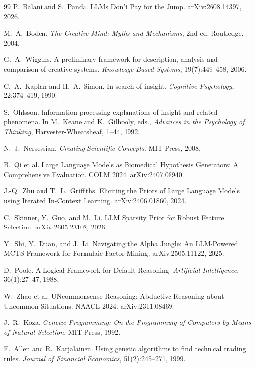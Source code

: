 \documentclass[11pt]{article}
\begin{document}
\begin{thebibliography}{99}
 P.~Balani and S.~Panda.
\newblock LLMs Don't Pay for the Jump.
\newblock arXiv:2608.14397, 2026.

 M.~A.~Boden.
\newblock \emph{The Creative Mind: Myths and Mechanisms}, 2nd ed. Routledge, 2004.

 G.~A.~Wiggins.
\newblock A preliminary framework for description, analysis and comparison of creative systems.
\newblock \emph{Knowledge-Based Systems}, 19(7):449--458, 2006.

 C.~A.~Kaplan and H.~A.~Simon.
\newblock In search of insight.
\newblock \emph{Cognitive Psychology}, 22:374--419, 1990.

 S.~Ohlsson.
\newblock Information-processing explanations of insight and related phenomena.
\newblock In M.~Keane and K.~Gilhooly, eds., \emph{Advances in the Psychology of Thinking},
Harvester-Wheatsheaf, 1--44, 1992.

 N.~J.~Nersessian.
\newblock \emph{Creating Scientific Concepts}. MIT Press, 2008.


 B.~Qi et al.
\newblock Large Language Models as Biomedical Hypothesis Generators: A Comprehensive Evaluation.
\newblock COLM 2024. arXiv:2407.08940.

 J.-Q.~Zhu and T.~L.~Griffiths.
\newblock Eliciting the Priors of Large Language Models using Iterated In-Context Learning.
\newblock arXiv:2406.01860, 2024.

 C.~Skinner, Y.~Guo, and M.~Li.
\newblock LLM Sparsity Prior for Robust Feature Selection.
\newblock arXiv:2605.23102, 2026.

 Y.~Shi, Y.~Duan, and J.~Li.
\newblock Navigating the Alpha Jungle: An LLM-Powered MCTS Framework for Formulaic Factor Mining.
\newblock arXiv:2505.11122, 2025.

 D.~Poole.
\newblock A Logical Framework for Default Reasoning.
\newblock \emph{Artificial Intelligence}, 36(1):27--47, 1988.

 W.~Zhao et al.
\newblock UNcommonsense Reasoning: Abductive Reasoning about Uncommon Situations.
\newblock NAACL 2024. arXiv:2311.08469.


 J.~R.~Koza.
\newblock \emph{Genetic Programming: On the Programming of Computers by Means of Natural Selection}.
MIT Press, 1992.

 F.~Allen and R.~Karjalainen.
\newblock Using genetic algorithms to find technical trading rules.
\newblock \emph{Journal of Financial Economics}, 51(2):245--271, 1999.


\end{thebibliography}
\end{document}
